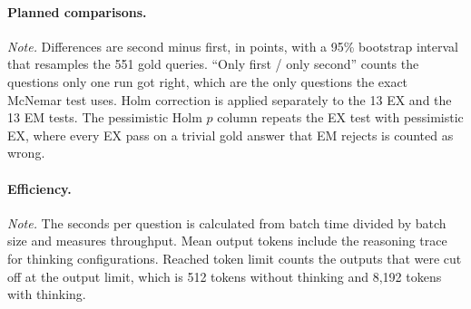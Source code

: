 \paragraph{Planned comparisons.}

\begin{table}[htbp]
\centering
\caption{Planned paired comparisons on the seed 42 runs.}
\label{tab:mcnemar}
\scriptsize
\setlength{\tabcolsep}{3pt}
\resizebox{\linewidth}{!}{}

\vspace{2pt}
\begin{minipage}{\linewidth}\scriptsize
\textit{Note.} Differences are second minus first, in points, with a 95\% bootstrap interval that resamples the 551 gold queries. ``Only first / only second'' counts the questions only one run got right, which are the only questions the exact McNemar test uses. Holm correction is applied separately to the 13 EX and the 13 EM tests. The pessimistic Holm $p$ column repeats the EX test with pessimistic EX, where every EX pass on a trivial gold answer that EM rejects is counted as wrong.
\end{minipage}
\end{table}

\paragraph{Efficiency.}

\begin{table}[htbp]
\centering
\caption{Generation cost per configuration on one NVIDIA L4.}
\label{tab:efficiency}
\small


\vspace{2pt}
\begin{minipage}{0.9\linewidth}\footnotesize
\textit{Note.} The seconds per question is calculated from batch time divided by batch size and measures throughput. Mean output tokens include the reasoning trace for thinking configurations. Reached token limit counts the outputs that were cut off at the output limit, which is 512 tokens without thinking and 8,192 tokens with thinking.
\end{minipage}
\end{table}

